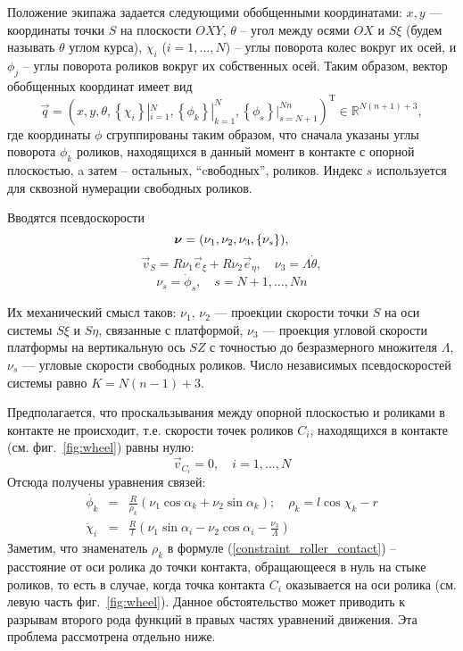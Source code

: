 \filbreak
Положение экипажа задается следующими обобщенными координатами:
$x, y$ --- координаты точки $S$ на плоскости $OXY$, $\theta$ -- угол между осями $OX$ и $S\xi$ (будем называть $\theta$ углом курса),
$\chi_i$ ($i = 1,\dots,N$) -- углы поворота колес вокруг их осей, и $\phi_j$ -- углы поворота роликов вокруг их собственных осей.
Таким образом, вектор обобщенных координат имеет вид
\begin{equation}\label{eq:q}
    \vec{q} = (
        x, y, \theta,
        \left\{\chi_i\right\}|_{i=1}^N,
        \left\{\phi_k\right\}|_{k=1}^N,
        \left\{\phi_s\right\}|_{s=N + 1}^{Nn}
    )^{\mathop{T}}\in\mathbb{R}^{N(n+1) + 3},    
\end{equation}
где координаты $\phi$ сгруппированы таким образом, что сначала указаны углы поворота $\phi_k$ роликов, находящихся в данный момент в контакте с опорной плоскостью, a затем -- остальных, ``cвободных'', роликов. Индекс $s$ используется для сквозной нумерации свободных роликов.

Вводятся псевдоскорости
$$
    \boldsymbol{\mathbf{\nu}} = (\nu_1, \nu_2, \nu_3, \left\{\nu_s\right\}),
$$
\begin{equation}\label{eq:vsnu3}
    \vec{v}_S = R\nu_1\vec{e}_\xi + R\nu_2\vec{e}_\eta, \quad \nu_3 = \Lambda\dot{\theta},
\end{equation}
\begin{equation}\label{eq:nus}
    \nu_s = \dot{\phi}_s, \quad s = N + 1,\ldots,Nn
\end{equation}

Их механический смысл таков: $\nu_1$, $\nu_2$ --- проекции скорости точки $S$ на оси системы $S\xi$ и $S\eta$, связанные с платформой, $\nu_3$ --- проекция угловой скорости платформы на вертикальную ось $SZ$ с точностью до безразмерного множителя $\Lambda$, $\nu_s$ --- угловые скорости свободных роликов. Число независимых псевдоскоростей системы равно $K = N(n-1)+3$.

Предполагается, что проскальзывания между опорной плоскостью и роликами в контакте не происходит, т.е. скорости точек роликов $C_i$, находящихся в контакте (см. фиг.~\ref{fig:wheel}) равны нулю:
\begin{equation}\label{eq:constraints_vec}
    \vec{v}_{C_i} = 0,\quad i = 1,\dots, N    
\end{equation}
Отсюда получены уравнения связей:
\begin{eqnarray}
\dot{\phi_k} &=& \frac{R}{\rho_k }(\nu_1\cos\alpha_k + \nu_2\sin\alpha_k); \quad \rho_k  = l\cos\chi_k - r \label{constraint_roller_contact}\\
\dot{\chi}_i &=& \frac{R}{l}(\nu_1\sin\alpha_i - \nu_2\cos\alpha_i - \frac{\nu_3}{\Lambda})\label{constraint_wheel_contact}
\end{eqnarray}
Заметим, что знаменатель $\rho_k$ в формуле (\ref{constraint_roller_contact}) -- расстояние от оси ролика до точки контакта, обращающееся в нуль на стыке роликов, то есть в случае, когда точка контакта $C_i$ оказывается на оси ролика (см. левую часть фиг.~\ref{fig:wheel}). Данное обстоятельство может приводить к разрывам второго рода функций в правых частях уравнений движения. Эта проблема рассмотрена отдельно ниже.

